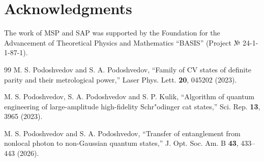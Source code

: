 \documentclass{optica-article}
\begin{document}
\section*{Acknowledgments}
The work of MSP and SAP was supported by the Foundation for the Advancement of Theoretical Physics and Mathematics “BASIS” (Project № 24-1-1-87-1).

\renewcommand{\refname}{References}
    \begin{thebibliography}{99}
        M. S. Podoshvedov and S. A. Podoshvedov, ``Family of CV states of definite parity and their metrological power,'' Laser Phys. Lett. {\bf 20}, 045202 (2023).

         M. S. Podoshvedov, S. A. Podoshvedov and S. P. Kulik, ``Algorithm of quantum engineering of large-amplitude high-fidelity Schr"odinger cat states,'' Sci. Rep. {\bf 13}, 3965 (2023).
        
         M. S. Podoshvedov and S. A. Podoshvedov, ``Transfer of entanglement from nonlocal photon to non-Gaussian quantum states,'' J. Opt. Soc. Am. B {\bf 43}, 433--443 (2026).
        
    \end{thebibliography}
\end{document}
